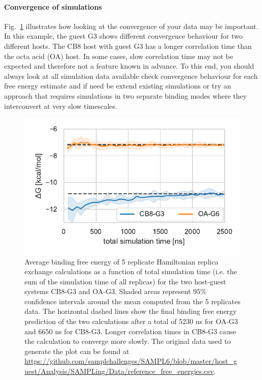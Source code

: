 \documentclass[9pt,bestpractices]{livecoms}
\begin{document}
\paragraph{Convergence of simulations}
Fig.~\ref{fig:freeenergytrajectories} illustrates how looking at the convergence of your data may be important. In this example, the guest G3 shows different convergence behaviour for two different hosts. The CB8 host with guest G3 has a longer correlation time than the octa acid (OA) host. In some cases, slow correlation time may not be expected and therefore not a feature known in advance. To this end, you should always look at all simulation data available check convergence behaviour for each free energy estimate and if need be extend existing simulations or try an approach that requires simulations in two separate binding modes where they interconvert at very slow timescales.  
\begin{figure}
    \includegraphics[width=0.90\linewidth]{figures/fig9_convergence/Figure.pdf}
    \caption{Average binding free energy of 5 replicate Hamiltonian replica exchange calculations as a function of total simulation time (i.e. the sum of the simulation time of all replicas) for the two host-guest systems CB8-G3 and OA-G3. Shaded areas represent 95\% confidence intervals around the mean computed from the 5 replicates data. The horizontal dashed lines show the final binding free energy prediction of the two calculations after a total of 5230 ns for OA-G3 and 6650 ns for CB8-G3. Longer correlation times in CB8-G3 cause the calculation to converge more slowly. The original data used to generate the plot can be found at \url{https://github.com/samplchallenges/SAMPL6/blob/master/host_guest/Analysis/SAMPLing/Data/reference_free_energies.csv}.
}
    \label{fig:freeenergytrajectories}
\end{figure}
\end{document}
